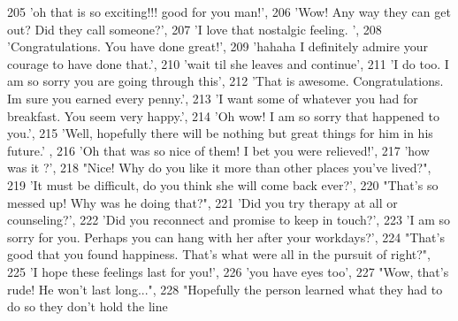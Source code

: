 \begin{DoxyCode}
205                             \textcolor{stringliteral}{'oh that is so exciting!!! good for you man!'},
206                             \textcolor{stringliteral}{'Wow! Any way they can get out? Did they call someone?'},
207                             \textcolor{stringliteral}{'I love that nostalgic feeling. '},
208                             \textcolor{stringliteral}{'Congratulations. You have done great!'},
209                             \textcolor{stringliteral}{'hahaha I definitely admire your courage to have done that.'},
210                             \textcolor{stringliteral}{'wait til she leaves and continue'},
211                             \textcolor{stringliteral}{'I do too.  I am so sorry you are going through this'},
212                             \textcolor{stringliteral}{'That is awesome. Congratulations. Im sure you earned every penny.'},
213                             \textcolor{stringliteral}{'I want some of whatever you had for breakfast. You seem very happy.'},
214                             \textcolor{stringliteral}{'Oh wow! I am so sorry that happened to you.'},
215                             \textcolor{stringliteral}{'Well, hopefully there will be nothing but great things for him in his future.'}
      ,
216                             \textcolor{stringliteral}{'Oh that was so nice of them! I bet you were relieved!'},
217                             \textcolor{stringliteral}{'how was it ?'},
218                             \textcolor{stringliteral}{"Nice! Why do you like it more than other places you've lived?"},
219                             \textcolor{stringliteral}{'It must be difficult, do you think she will come back ever?'},
220                             \textcolor{stringliteral}{"That's so messed up! Why was he doing that?"},
221                             \textcolor{stringliteral}{'Did you try therapy at all or counseling?'},
222                             \textcolor{stringliteral}{'Did you reconnect and promise to keep in touch?'},
223                             \textcolor{stringliteral}{'I am so sorry for you. Perhaps you can hang with her after your workdays?'},
224                             \textcolor{stringliteral}{"That's good that you found happiness. That's what were all in the pursuit of
       right?"},
225                             \textcolor{stringliteral}{'I hope these feelings last for you!'},
226                             \textcolor{stringliteral}{'you have eyes too'},
227                             \textcolor{stringliteral}{"Wow, that's rude! He won't last long..."},
228                             \textcolor{stringliteral}{"Hopefully the person learned what they had to do so they don't hold the line
}
\end{DoxyCode}
